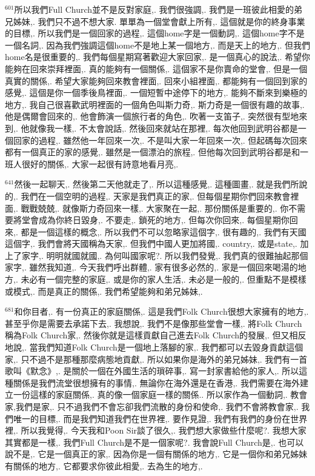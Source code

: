 \documentclass{book}
\begin{document}
$^{601}$所以我們Full Church並不是反對家庭,.
我們很強調,.
我們是一班彼此相愛的弟兄姊妹,.
我們只不過不想大家.
單單為一個堂會獻上所有,.
這個就是你的終身事業的目標,.
所以我們是一個回家的過程,.
這個home字是一個動詞,.
這個home字不是一個名詞,.
因為我們強調這個home不是地上某一個地方,.
而是天上的地方,.
但我們home名是很重要的,.
我們每個星期寫著歡迎大家回家,.
是一個真心的說法,.
希望你能夠在回來崇拜裡面,.
真的能夠有一個關係,.
這個家不是你賣命的堂會,.
但是一個真實的關係,.
希望大家能夠回來教會裡面,.
回來小組裡面,.
都能夠有一個回到家的感覺,.
這個是你一個季後鳥裡面,.
一個短暫中途停下的地方,.
能夠不斷來到樂極的地方,.
我自己很喜歡武明裡面的一個角色叫斯力奇,.
斯力奇是一個很有趣的故事,.
他是偶爾會回來的,.
他會飾演一個旅行者的角色,.
吹著一支笛子,.
突然很有型地來到,.
他就像我一樣,.
不太會說話,.
然後回來就站在那裡,.
每次他回到武明谷都是一個回家的過程,.
雖然他一年回來一次,.
不是叫大家一年回來一次,.
但起碼每次回來都有一個真正的家的感覺,.
雖然是一個漂泊的旅程,.
但他每次回到武明谷都是和一班人很好的關係,.
大家一起很有詩意地看月亮,.

$^{641}$然後一起聊天,.
然後第二天他就走了,.
所以這種感覺,.
這種圖畫,.
就是我們所說的,.
我們在一個空明的過程,.
天家是我們真正的家,.
但每個星期你們回來教會裡面,.
戰戰兢兢,.
就像斯力奇回來一樣,.
大家聚在一起,.
那份關係是重要的,.
你不需要將堂會成為你終日毀身,.
不要走,.
鎖死的地方,.
但每次你回來,.
每個星期你回來,.
都是一個這樣的概念,.
所以我們不可以忽略家這個字,.
很有趣的,.
我們有天國這個字,.
我們會將天國稱為天家,.
但我們中國人更加將國,.
country,.
或是state,.
加上了家字,.
明明就國就國,.
為何叫國家呢?.
所以我們發覺,.
我們真的很難抽起那個家字,.
雖然我知道,.
今天我們呼出群體,.
家有很多必然的,.
家是一個回來喝湯的地方,.
未必有一個完整的家庭,.
或是你的家人生活,.
未必是一般的,.
但重點不是模樣或模式,.
而是真正的關係,.
我們希望能夠和弟兄姊妹,.

$^{681}$和你目者,.
有一份真正的家庭關係,.
這是我們Folk Church很想大家擁有的地方,.
甚至乎你是需要去承諾下去,.
我想說,.
我們不是像那些堂會一樣,.
將Folk Church稱為Folk Church家,.
然後你就是這樣貢獻自己進去Folk Church的發展,.
但又相反地說,.
當我們知道Folk Church是一個地上落腳的家,.
我們都可以去毀身貢獻這個家,.
只不過不是那種那麼病態地貢獻,.
所以如果你是海外的弟兄姊妹,.
我們有一首歌叫《默念》,.
是關於一個在外國生活的瑣碎事,.
寫一封家書給他的家人,.
所以這種關係是我們流堂很想擁有的事情,.
無論你在海外還是在香港,.
我們需要在海外建立一份這樣的家庭關係,.
真的像一個家庭一樣的關係..
所以家作為一個動詞,.
教會家,我們是家,.
只不過我們不會忘卻我們流散的身份和使命,.
我們不會將教會家,.
我們唯一的目標,.
而是我們知道我們在世界裡,.
要作見證,.
我們有我們的身份在世界裡,.
所以我覺得,.
今天我和Poon Sir談了很久,.
我們想大家做些什麼呢?.
我想大家其實都是一樣,.
我們Full Church是不是一個家呢?.
我會說Full Church是,.
也可以說不是,.
它是一個真正的家,.
因為你是一個有關係的地方,.
它是一個你和弟兄姊妹有關係的地方,.
它都要求你彼此相愛,.
去為生的地方,.
\end{document}
